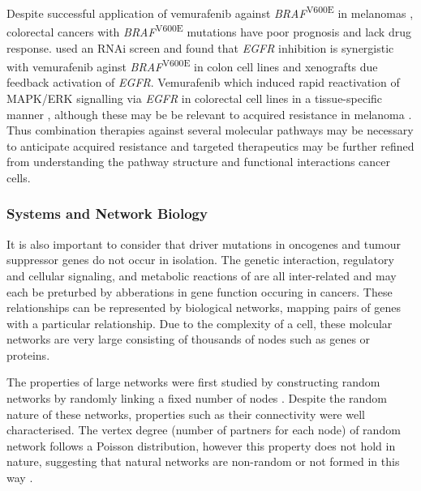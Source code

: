 Despite successful application of vemurafenib against \textit{BRAF}\textsuperscript{V600E} in melanomas \citet{Dienstmann2011, Ravnan2012}, colorectal cancers with \textit{BRAF}\textsuperscript{V600E} mutations have poor prognosis and lack drug response. \citet{Prahallad2012} used an RNAi screen and found that \textit{EGFR} inhibition is synergistic with vemurafenib aginst \textit{BRAF}\textsuperscript{V600E} in colon cell lines and xenografts due feedback activation of \textit{EGFR}. Vemurafenib which induced rapid reactivation of MAPK/ERK signalling via \textit{EGFR} in colorectal cell lines in a tissue-specific manner \citet{Corcoran2012}, although these may be be relevant to acquired resistance in melanoma \citet{Sun2014}. Thus combination therapies against several molecular pathways may be necessary to anticipate acquired resistance \citet{Ravnan2012} and targeted therapeutics may be further refined from understanding the pathway structure and functional interactions cancer cells.

\subsubsection{Systems and Network Biology}

It is also important to consider that driver mutations in oncogenes and tumour suppressor genes do not occur in isolation. The genetic interaction, regulatory and cellular signaling, and metabolic reactions of are all inter-related and may each be preturbed by abberations in gene function occuring in cancers. These relationships can be represented by biological networks, mapping pairs of genes with a particular relationship. Due to the complexity of a cell, these molcular networks are very large consisting of thousands of nodes such as genes or proteins. 

The properties of large networks were first studied by constructing random networks by randomly linking a fixed number of nodes \citep{Erdos1959, Erdos1960}. Despite the random nature of these networks, properties such as their connectivity were well characterised. The vertex degree (number of partners for each node) of random network follows a Poisson distribution, however this property does not hold in nature, suggesting that natural networks are non-random or not formed in this way \citet{Barabasi2004}. 

